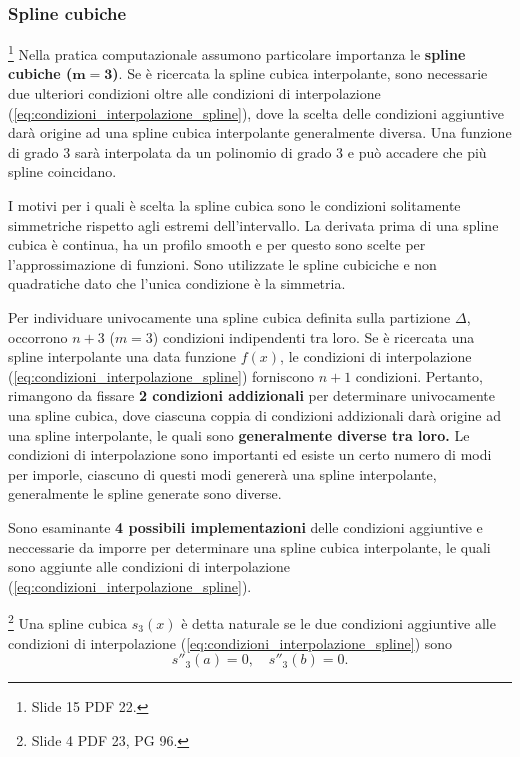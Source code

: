 \subsubsection{Spline cubiche}
\begin{remark}
    \footnote{Slide 15 PDF 22.}
    Nella pratica computazionale assumono particolare importanza le \textbf{spline cubiche ($\boldsymbol{m=3}$)}. Se è ricercata la spline cubica interpolante, sono necessarie due ulteriori condizioni oltre alle condizioni di interpolazione (\ref{eq:condizioni_interpolazione_spline}), dove la scelta delle condizioni aggiuntive darà origine ad una spline cubica interpolante generalmente diversa. Una funzione di grado 3 sarà interpolata da un polinomio di grado 3 e può accadere che più spline coincidano.
\end{remark}

I motivi per i quali è scelta la spline cubica sono le condizioni solitamente simmetriche rispetto agli estremi dell'intervallo. La derivata prima di una spline cubica è continua, ha un profilo smooth e per questo sono scelte per l'approssimazione di funzioni. Sono utilizzate le spline cubiciche e non quadratiche dato che l'unica condizione è la simmetria.

Per individuare univocamente una spline cubica definita sulla partizione $\Delta$, occorrono $n+3$ ($m=3$) condizioni indipendenti tra loro. Se è ricercata una spline interpolante una data funzione $f(x)$, le condizioni di interpolazione (\ref{eq:condizioni_interpolazione_spline}) forniscono $n+1$ condizioni. Pertanto, rimangono da fissare \textbf{2 condizioni addizionali} per determinare univocamente una spline cubica, dove ciascuna coppia di condizioni addizionali darà origine ad una spline interpolante, le quali sono \textbf{generalmente diverse tra loro.} Le condizioni di interpolazione sono importanti ed esiste un certo numero di modi per imporle, ciascuno di questi modi genererà una spline interpolante, generalmente le spline generate sono diverse.

Sono esaminante \textbf{4 possibili implementazioni} delle condizioni aggiuntive e neccessarie da imporre per determinare una spline cubica interpolante, le quali sono aggiunte alle condizioni di interpolazione (\ref{eq:condizioni_interpolazione_spline}).
\begin{definition}
	\footnote{Slide 4 PDF 23, PG 96.} Una spline cubica $s_3(x)$ è detta naturale se le due condizioni aggiuntive alle condizioni di interpolazione (\ref{eq:condizioni_interpolazione_spline}) sono
	\begin{equation}\label{eq:condizioni_spline_cubica_naturale}
    \boxed{s''_3(a)=0,\quad s''_3(b)=0.}
\end{equation}
\end{definition}

